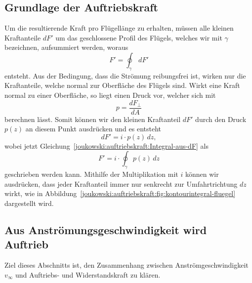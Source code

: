 \subsection{Grundlage der Auftriebskraft}
	Um die resultierende Kraft pro Flügellänge zu erhalten,	
	müssen alle kleinen Kraftanteile $dF'$ um das geschlossene Profil des Flügels,
	welches wir mit $\gamma$ bezeichnen,
	aufsummiert werden, woraus
	\begin{equation}
		F'
		=
		\displaystyle\oint_{\gamma}
		\, dF'
		\label{joukowski:auftriebskraft:Integral-aus-dF}
	\end{equation}
	entsteht.
	Aus der Bedingung, dass die Strömung reibungsfrei ist,
	wirken nur die Kraftanteile,
	welche normal zur Oberfläche des Flügels sind.
	Wirkt eine Kraft normal zu einer Oberfläche,
	so liegt einen Druck vor, welcher sich mit
	\[
		p
		=
		\frac{dF_\perp}{dA}
	\]
	berechnen lässt.
	Somit können wir den kleinen Kraftanteil $dF'$ durch den Druck $p(z)$ an diesem Punkt ausdrücken
	und es entsteht
	\[
		dF'
		=
		i \cdot p(z)
		\, dz,
	\]
	wobei jetzt Gleichung~\eqref{joukowski:auftriebskraft:Integral-aus-dF} als
	\begin{equation}
		F'
		=
		i \cdot \displaystyle\oint_{\gamma}
		p(z)
		\, dz
		\label{joukowski:auftriebskraft:Integral-aus-p}
	\end{equation}
	geschrieben werden kann.
	Mithilfe der Multiplikation mit $i$ können wir ausdrücken,
	dass jeder Kraftanteil immer nur senkrecht zur Umfahrtrichtung $dz$ wirkt,
	wie in Abbildung~\ref{joukowski:auftriebskraft:fig:kontourintegral-fluegel} dargestellt wird.
	
	

\subsection{Aus Anströmungsgeschwindigkeit wird Auftrieb}
	Ziel dieses Abschnitts ist, den Zusammenhang zwischen Anströmgeschwindigkeit $v_\infty$ und Auftriebs- und Widerstandskraft zu klären.
%
%
	
